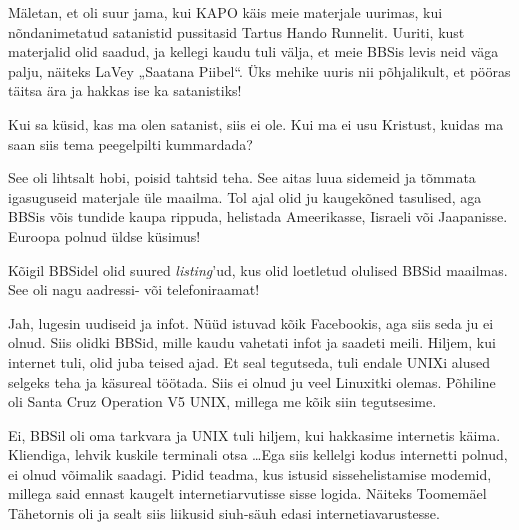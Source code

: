 Mäletan, et oli suur jama, kui KAPO käis meie materjale uurimas, 
kui nõndanimetatud satanistid pussitasid Tartus Hando 
Runnelit. Uuriti, kust materjalid olid saadud, ja kellegi 
kaudu tuli välja, et meie BBSis levis neid väga palju, näiteks LaVey „Saatana 
Piibel“. Üks mehike uuris nii põhjalikult, 
et pööras täitsa ära ja hakkas ise ka satanistiks!

Kui sa küsid, kas ma olen satanist, siis ei ole. Kui ma ei 
usu Kristust, kuidas ma saan siis tema peegelpilti kummardada?


See oli lihtsalt hobi, poisid tahtsid teha. See aitas luua sidemeid ja tõmmata igasuguseid materjale üle 
maailma. Tol ajal olid ju kaugekõned tasulised, aga BBSis võis tundide kaupa rippuda, helistada 
Ameerikasse, Iisraeli või Jaapanisse. Euroopa polnud üldse küsimus!


Kõigil BBSidel olid suured \emph{listing}'ud, kus olid loetletud 
olulised BBSid maailmas. See oli nagu aadressi- või telefoniraamat! 


Jah, lugesin uudiseid ja infot. Nüüd istuvad kõik Facebookis, aga siis seda ju 
ei olnud. Siis olidki BBSid, mille kaudu vahetati infot ja saadeti meili. Hiljem, kui internet tuli, olid juba teised ajad. Et seal 
tegutseda, tuli endale UNIXi alused selgeks teha ja käsureal töötada. Siis ei 
olnud ju veel Linuxitki olemas. Põhiline oli Santa Cruz 
Operation V5 UNIX, millega 
me kõik siin tegutsesime.


Ei, BBSil oli oma tarkvara ja UNIX tuli hiljem, kui hakkasime internetis 
käima. Kliendiga, lehvik kuskile terminali otsa \ldots Ega siis kellelgi kodus 
internetti polnud, ei olnud võimalik saadagi. Pidid teadma, kus istusid sissehelistamise modemid, millega said ennast kaugelt internetiarvutisse 
sisse logida. Näiteks Toomemäel Tähetornis oli ja sealt siis 
liikusid siuh-säuh edasi internetiavarustesse.


